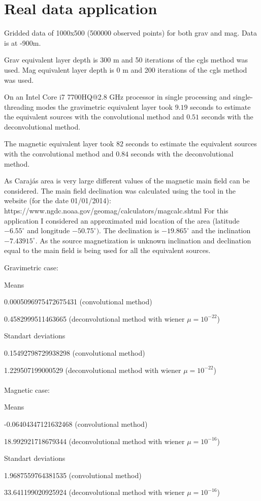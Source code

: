 \section{Real data application}
\label{sec:real_data}

Gridded data of 1000x500 (500000 observed points) for both grav and mag. Data is at -900m.

Grav equivalent layer depth is 300 m and 50 iterations of the cgls method was used.
Mag equivalent layer depth is 0 m and 200 iterations of the cgls method was used.

On an Intel Core i7 7700HQ@2.8 GHz processor in single processing and single-threading modes
the gravimetric equivalent layer took $9.19$ seconds to estimate the equivalent sources with the convolutional method and $0.51$ seconds with the deconvolutional method. 

The magnetic equivalent layer took $82$ seconds to estimate the equivalent sources with the convolutional method and $0.84$ seconds with the deconvolutional method.

As Carajás area is very large different values of the magnetic main field can be considered. 
The main field declination was calculated using the tool in the website (for the date 01/01/2014): https://www.ngdc.noaa.gov/geomag/calculators/magcalc.shtml
For this application I considered an approximated mid location of the area (latitude $-6.55^{\circ}$ and longitude $-50.75^{\circ})$. The declination is $-19.865^{\circ}$ and the inclination $-7.43915^{\circ}$.
As the source magnetization is unknown inclination and declination equal to the main field is being used for all the equivalent sources.

Gravimetric case:

Means

0.0005096975472675431 (convolutional method)

0.4582999511463665 (deconvolutional method with wiener $\mu = 10^{-22}$)

Standart deviations

0.15492798729938298 (convolutional method)

1.229507199000529 (deconvolutional method with wiener $\mu = 10^{-22}$)
\\\\
Magnetic case:

Means

-0.06404347121632468 (convolutional method)

18.992921718679344 (deconvolutional method with wiener $\mu = 10^{-16}$)

Standart deviations

1.9687559764381535 (convolutional method)

33.641199020925924 (deconvolutional method with wiener $\mu = 10^{-16}$)
